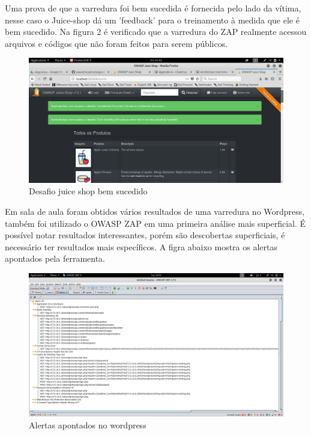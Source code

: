 \documentclass[journal]{IEEEtran}
\begin{document}
Uma prova de que a varredura foi bem sucedida é fornecida pelo lado da vítima, nesse caso o Juice-shop dá um 'feedback' para o treinamento à medida que ele é bem sucedido. Na figura 2 é verificado que a varredura do ZAP realmente acessou arquivos e códigos que não foram feitos para serem públicos.

\begin{figure}[h!]
	\includegraphics[width=\linewidth]{../fotos/juice_shop/desafio_juice_shop.png}
	\caption{Desafio juice shop bem sucedido}
	\label{fig:successful_challenge}
\end{figure}

Em sala de aula foram obtidos vários resultados de uma varredura no Wordpress, também foi utilizado o OWASP ZAP em uma primeira análise mais superficial. É possível notar resultados interessantes, porém são descobertas superficiais, é necessário ter resultados mais específicos. A figra abaixo mostra os alertas apontados pela ferramenta.

\begin{figure}[h!]
	\includegraphics[width=\linewidth]{../fotos/OWASP_ZAP_FOTOS/zap_alerts.png}
	\caption{Alertas apontados no wordpress}
	\label{fig:wordpress_alerts}
\end{figure}
\end{document}

